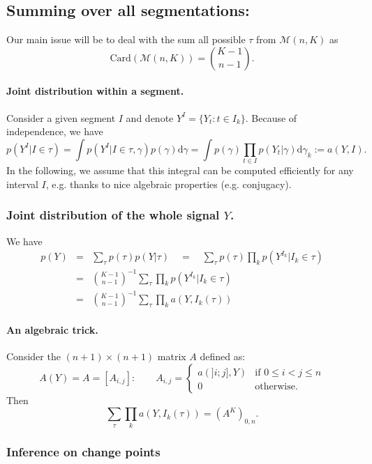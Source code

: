 \documentclass[12pt]{article}
\newcommand{\dd}{\text{d}}
\newcommand{\Mcal}{\mathcal{M}}
\begin{document}
\subsection{Summing over all segmentations: \cite{RLR11}}

Our main issue will be to deal with the sum all possible $\tau$ from $\Mcal(n, K)$ as
$$
\text{Card}(\Mcal(n, K)) = \binom{K-1}{n-1}.
$$

\paragraph{Joint distribution within a segment.}
Consider a given segment $I$ and denote $Y^I = \{Y_t: t\in I_k\}$. Because of independence, we have
$$
p(Y^I|I \in \tau) = \int p(Y^I | I \in \tau, \gamma) p(\gamma) \dd \gamma
= \int p(\gamma) \prod_{t \in I} p(Y_t | \gamma) \dd \gamma_k := a(Y, I).
$$
In the following, we assume that this integral can be computed efficiently for any interval $I$, e.g. thanks to nice algebraic properties (e.g. conjugacy).

\subsubsection{Joint distribution of the whole signal $Y$.}
We have
\begin{eqnarray*}
 p(Y) & = & \sum_\tau p(\tau) p(Y|\tau) \quad = \quad \sum_\tau p(\tau) \prod_k p(Y^{I_k}|I_k \in \tau) \\
 & = & \binom{K-1}{n-1}^{-1} \sum_\tau \prod_k p(Y^{I_k}|I_k \in \tau) \\
 & = & \binom{K-1}{n-1}^{-1} \sum_\tau \prod_k a(Y, I_k(\tau))
\end{eqnarray*}

\paragraph{An algebraic trick.} Consider the $(n+1) \times (n+1)$ matrix $A$ defined as:
$$
A(Y) = A = [A_{i, j}]: \qquad
A_{i, j} = \left\{
  \begin{array}{rl}
    a(]i; j], Y) & \text{if } 0 \leq i < j \leq n  \\
    0 & \text{otherwise}.
  \end{array}
  \right.
$$
Then
$$
 \sum_\tau \prod_k a(Y, I_k(\tau)) = (A^K)_{0, n}.
$$

\subsubsection{Inference on change points}
\end{document}
